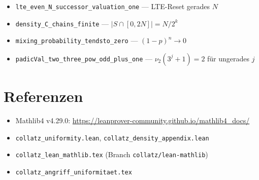 \documentclass[12pt,a4paper]{article}
\newcommand{\vii}{\nu_2}
\begin{document}
\begin{tcolorbox}[vorhanden,title={Bereits in eigenen Lean-Dateien (ohne sorry)}]
\begin{itemize}[nosep]
  \item \texttt{lte\_even\_N\_successor\_valuation\_one} --- LTE-Reset gerades $N$
  \item \texttt{density\_C\_chains\_finite} --- $|S\cap[0,2N]|=N/2^k$
  \item \texttt{mixing\_probability\_tendsto\_zero} --- $(1-p)^n\to 0$
  \item \texttt{padicVal\_two\_three\_pow\_odd\_plus\_one} --- $\vii(3^j+1)=2$ für ungerades $j$
\end{itemize}
\end{tcolorbox}

\section*{Referenzen}
\begin{itemize}[nosep]
  \item Mathlib4 v4.29.0: \url{https://leanprover-community.github.io/mathlib4_docs/}
  \item \texttt{collatz\_uniformity.lean}, \texttt{collatz\_density\_appendix.lean}
  \item \texttt{collatz\_lean\_mathlib.tex} (Branch \texttt{collatz/lean-mathlib})
  \item \texttt{collatz\_angriff\_uniformitaet.tex}
\end{itemize}
\end{document}
